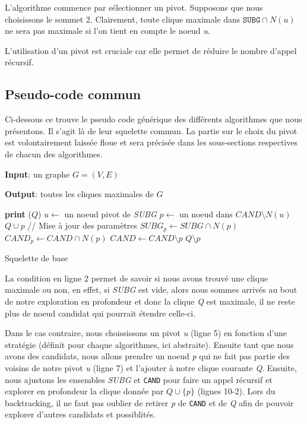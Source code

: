 \documentclass[12pt,a4paper]{article}
\begin{document}
L'algorithme commence par sélectionner un pivot. Supposons que nous choisissons le sommet 2.
Clairement, toute clique maximale dans \(\texttt{SUBG} \cap N(u)\) ne sera pas maximale si l'on tient en compte le noeud \emph{u}.

L'utilisation d'un pivot est cruciale car elle permet de réduire le nombre d'appel récursif.

\subsection{Pseudo-code commun}%
\label{subsec:algo}

Ci-dessous ce trouve le pseudo code générique des différents algorithmes que nous présentons. Il s'agit là de leur squelette commun. La partie sur le choix du pivot est volontairement laissée floue et sera précisée dans les sous-sections respectives de chacun des algorithmes.

\begin{algorithm}[H]
  \textbf{Input}: un graphe $G = (V,E)$

  \textbf{Output}: toutes les cliques maximales de $G$
  \begin{algorithmic}[1]
       
        \State \textbf{print} ($ Q $)
      \Else
        \State $u \gets$ un noeud pivot de \emph{SUBG}
          \State $p \gets$ un noeud dans $CAND \setminus N(u)$
          \State $ Q \cup p $ 
          \State // Mise à jour des paramètres
          \State $SUBG_p \gets SUBG \cap N(p)$
          \State $CAND_p \gets CAND \cap N(p)$
          \State {}
          \State $CAND \gets CAND \setminus {p}$
          \State $ Q \setminus p $ 
        \EndWhile
      \EndIf
    \EndProcedure
    \State {}
  \end{algorithmic}
  \caption{Squelette de base}
  \label{fig:alg}
\end{algorithm}

La condition en ligne 2 permet de savoir si nous avons trouvé une clique maximale ou non, en effet, si \emph{SUBG} est vide, alors nous sommes arrivés au bout de notre exploration en profondeur et donc la clique \emph{Q} est maximale, il ne reste plus de noeud candidat qui pourrait étendre celle-ci.

Dans le cas contraire, nous choississons un pivot \emph{u} (ligne 5) en fonction d'une stratégie (définit pour chaque algorithmes, ici abstraite). Ensuite tant que nous avons des candidats, nous allons prendre un noeud \emph{p} qui ne fait pas partie des voisins de notre pivot \emph{u} (ligne 7) et l'ajouter à notre clique courante \emph{Q}. Ensuite, nous ajustons les ensembles \emph{SUBG} et \texttt{CAND} pour faire un appel récursif et explorer en profondeur la clique donnée par \(Q \cup \{p\}\) (lignes 10-2).
Lors du backtracking, il ne faut pas oublier de retirer \emph{p} de \texttt{CAND} et de \emph{Q} afin de pouvoir explorer d'autres candidats et possiblités.
\end{document}
